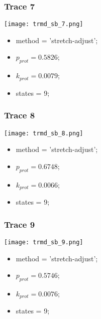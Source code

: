\subsubsection{Trace 7}
\begin{minipage}[c]{0.7\textwidth}
    \texttt{[image: trmd\_sb\_7.png]}
\end{minipage}
\hfill
\begin{minipage}[c]{0.45\textwidth}
    \begin{itemize}
        \item method = 'stretch-adjust';
        \item $p_{prot}=0.5826$;
        \item $k_{prot}=0.0079$;
        \item states = 9;
    \end{itemize}
\end{minipage}

\subsubsection{Trace 8}
\begin{minipage}[c]{0.7\textwidth}
    \texttt{[image: trmd\_sb\_8.png]}
\end{minipage}
\hfill
\begin{minipage}[c]{0.45\textwidth}
    \begin{itemize}
        \item method = 'stretch-adjust';
        \item $p_{prot}=0.6748$;
        \item $k_{prot}=0.0066$;
        \item states = 9;
    \end{itemize}
\end{minipage}

\subsubsection{Trace 9}
\begin{minipage}[c]{0.7\textwidth}
    \texttt{[image: trmd\_sb\_9.png]}
\end{minipage}
\hfill
\begin{minipage}[c]{0.45\textwidth}
    \begin{itemize}
        \item method = 'stretch-adjust';
        \item $p_{prot}=0.5746$;
        \item $k_{prot}=0.0076$;
        \item states = 9;
    \end{itemize}
\end{minipage}

